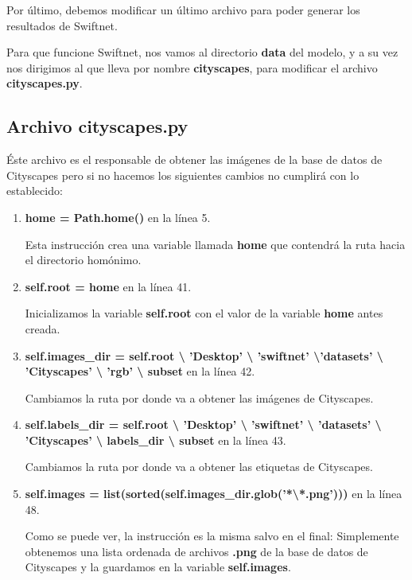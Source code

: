 Por último, debemos modificar un último archivo para poder generar los resultados de Swiftnet.

Para que funcione Swiftnet, nos vamos al directorio \textbf{data} del modelo, y a su vez nos dirigimos al que lleva por nombre \textbf{cityscapes}, para modificar el archivo \textbf{cityscapes.py}.

\subsection{Archivo cityscapes.py}

Éste archivo es el responsable de obtener las imágenes de la base de datos de Cityscapes pero si no hacemos los siguientes cambios no cumplirá con lo establecido:

\begin{enumerate}
\item \textbf{home = Path.home()} en la línea 5.

Esta instrucción crea una variable llamada \textbf{home} que contendrá la ruta hacia el directorio homónimo.

\item \textbf{self.root = home} en la línea 41.

Inicializamos la variable \textbf{self.root} con el valor de la variable \textbf{home} antes creada.

\item \textbf{self.images\_dir = self.root \textbackslash{} 'Desktop' \textbackslash{} 'swiftnet' \textbackslash{}'datasets' \textbackslash{} 'Cityscapes' \textbackslash{} 'rgb' \textbackslash{} subset} en la línea 42.

Cambiamos la ruta por donde va a obtener las imágenes de Cityscapes.

\item \textbf{self.labels\_dir = self.root \textbackslash{} 'Desktop' \textbackslash{} 'swiftnet' \textbackslash{} 'datasets' \textbackslash{} 'Cityscapes' \textbackslash{} labels\_dir \textbackslash{} subset} en la línea 43.

Cambiamos la ruta por donde va a obtener las etiquetas de Cityscapes.

\item \textbf{self.images = list(sorted(self.images\_dir.glob('*\textbackslash{*.png}')))} en la línea 48.

Como se puede ver, la instrucción es la misma salvo en el final: Simplemente obtenemos una lista ordenada de archivos \textbf{.png} de la base de datos de Cityscapes y la guardamos en la variable \textbf{self.images}.
\end{enumerate}

